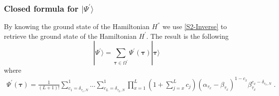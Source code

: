 \documentclass[10pt]{article}
\numberwithin{equation}{section}
\numberwithin{equation}{subsection}
\newcommand{\dt}{\;.}
\begin{document}
\subsubsection{Closed formula for $|\Psi^{'}\rangle$}\label{subsectionSSdual}
By knowing the ground state  of the Hamiltonian $H^{''}$ we use \eqref{S2-Inverse} to retrieve the ground state of the Hamiltonian $H^{'}$. The result is the following 
\begin{equation}\label{ABS-vect}
    |\Psi^{'}\rangle =\sum_{\bm{\tau}\in \Omega^{'}}\Psi^{'}(\bm{\tau})|\bm{\tau}\rangle 
\end{equation}
where  
\begin{equation}\label{ABS}
		\begin{split}
			\Psi^{'}(\bm{\tau})=\frac{1}{(L+1)!}\sum_{c_{1}=\delta_{\tau_{1},N}}^{1}\ldots\sum_{c_{L}=\delta_{\tau_{L},N}}^{1}\prod_{x=1}^{L}\left(1+\sum_{j=x}^{L}c_{j}\right)(\alpha_{\tau_{x}}-\beta_{\tau_{x}})^{1-c_{x}}\beta_{\tau_{x}}^{c_{x}-\delta_{\tau_{x},N}}\dt
		\end{split}
	\end{equation} 
\begin{comment}
{\color{blue}
	\begin{equation}
		\Psi^{'}(\bm{\tau})=\frac{1}{(L+1)!}\sum_{c_{1}=0}^{1-\delta_{\tau_{1},N}}\ldots\sum_{c_{L}=0}^{1-\delta_{\tau_{L},N}}\prod_{x=1}^{L}(\alpha_{\tau_{x}}-\beta_{\tau_{x}})^{c_{x}}\left(2+L-x-\sum_{j=x}^{L}c_{j}\right)\beta_{\tau_{x}}^{(1-c_{x}-\delta_{\tau_{x},N})}
	\end{equation}
\begin{equation}
	\Psi^{'}(\bm{\tau})=\sum_{c_{1}=0}^{1-\delta_{\tau_{1},N}}\ldots\sum_{c_{L}=0}^{1-\delta_{\tau_{L},N}}\frac{\Gamma(2+L-\sum_{z=1}^{L}c_{z})}{\Gamma(L+2)}\prod_{x=1}^{L}\left((\alpha_{\tau_{x}}-\beta_{\tau_{x}})\left(2+L-x-\sum_{j=x}^{L}c_{j}\right)\right)^{c_{x}}\beta_{\tau_{x}}^{(1-c_{x})(1-\delta_{\tau_{x},N})}\dt
\end{equation}
	\begin{equation}
		\Psi^{'}(\bm{\tau})=\frac{1}{(L+1)!}\sum_{c_{1}=0}^{1-\delta_{\tau_{1},N}}\ldots\sum_{c_{L}=0}^{1-\delta_{\tau_{L},N}}\prod_{x=1}^{L}\left(\frac{(\alpha_{\tau_{x}}-\beta_{\tau_{x}})}{\beta_{\tau_x}}\right)^{c_{x}}\left(2+L-x-\sum_{j=x}^{L}c_{j}\right)\beta_{\tau_{x}}^{1-\delta_{\tau_{x},N} }
	\end{equation}
}
\end{comment}
\end{document}
